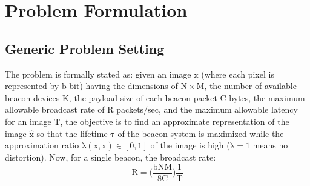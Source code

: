 




\section{Problem Formulation}
\label{sec:problem}

\subsection{Generic Problem Setting}

The problem is formally stated as: given an image $\mathrm{x}$ (where each pixel is represented by $\mathrm{b}$ bit) having the dimensions of $\mathrm{N \times M}$, the number of available beacon devices $\mathrm{K}$, the payload size of each beacon packet $\mathrm{C}$ bytes, the maximum allowable broadcast rate of $\mathrm{R}$ packets/sec, and the maximum allowable latency for an image $\mathrm{T}$, the objective is to find an approximate representation of the image $\mathrm{\hat{x}}$ so that the lifetime $\mathrm{\tau}$ of the beacon system is maximized while the approximation ratio $\mathrm{\lambda(x, \hat{x}) \in [0,1]}$ of the image is high ($\mathrm{\lambda = 1}$ means no distortion). Now, for a single beacon, the broadcast rate:
\begin{equation}
	\mathrm{R = \bigg( \frac{bNM}{8C} \bigg) \frac{1}{T}}
	\label{eq:1}
\end{equation}

